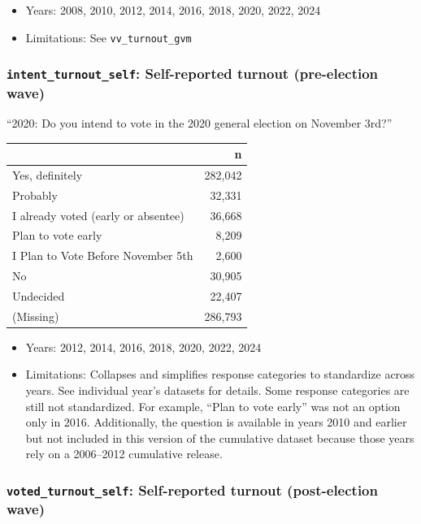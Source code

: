 \documentclass[10pt,article,oneside]{memoir}
\begin{document}
\begin{itemize}
\tightlist
\item
  Years: 2008, 2010, 2012, 2014, 2016, 2018, 2020, 2022, 2024
\item
  Limitations: See \texttt{vv\_turnout\_gvm}
\end{itemize}

\subsubsection{\texorpdfstring{\texttt{intent\_turnout\_self}:
Self-reported turnout (pre-election
wave)}{intent\_turnout\_self: Self-reported turnout (pre-election wave)}}\label{intent_turnout_self-self-reported-turnout-pre-election-wave}

``2020: Do you intend to vote in the 2020 general election on November
3rd?''

\begin{table}[H]
\centering
\begin{tabular}[t]{lr}
\toprule
 & n\\
\midrule
Yes, definitely & 282,042\\
Probably & 32,331\\
I already voted (early or absentee) & 36,668\\
Plan to vote early & 8,209\\
I Plan to Vote Before November 5th & 2,600\\
No & 30,905\\
Undecided & 22,407\\
(Missing) & 286,793\\
\bottomrule
\end{tabular}
\end{table}

\begin{itemize}
\tightlist
\item
  Years: 2012, 2014, 2016, 2018, 2020, 2022, 2024
\item
  Limitations: Collapses and simplifies response categories to
  standardize across years. See individual year's datasets for details.
  Some response categories are still not standardized. For example,
  ``Plan to vote early'' was not an option only in 2016. Additionally,
  the question is available in years 2010 and earlier but not included
  in this version of the cumulative dataset because those years rely on
  a 2006--2012 cumulative release.
\end{itemize}

\subsubsection{\texorpdfstring{\texttt{voted\_turnout\_self}:
Self-reported turnout (post-election
wave)}{voted\_turnout\_self: Self-reported turnout (post-election wave)}}\label{voted_turnout_self-self-reported-turnout-post-election-wave}
\end{document}
